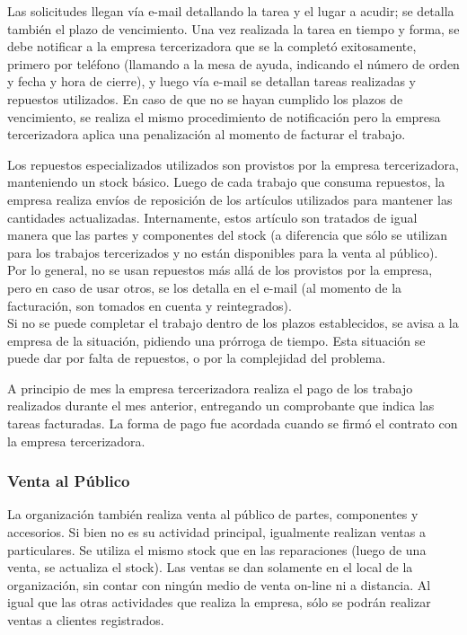 \documentclass[12pt]{extarticle}
\begin{document}
\begin{spacing}{1.2}
    Las solicitudes llegan vía e-mail detallando la tarea y el lugar a acudir; se detalla también el plazo de vencimiento.
    Una vez realizada la tarea en tiempo y forma, se debe notificar a la empresa tercerizadora que se la completó exitosamente, primero por teléfono (llamando a la mesa de ayuda, indicando el número de orden y fecha y hora de cierre), y luego vía e-mail se detallan tareas realizadas y repuestos utilizados.
    En caso de que no se hayan cumplido los plazos de vencimiento, se realiza el mismo procedimiento de notificación pero la empresa tercerizadora aplica una penalización al momento de facturar el trabajo.

    Los repuestos especializados utilizados son provistos por la empresa tercerizadora, manteniendo un stock básico. Luego de cada trabajo que consuma repuestos, la empresa realiza envíos de reposición de los artículos utilizados para mantener las cantidades actualizadas. 
    Internamente, estos artículo son tratados de igual manera que las partes y componentes del stock (a diferencia que sólo se utilizan para los trabajos tercerizados y no están disponibles para la venta al público).
    Por lo general, no se usan repuestos más allá de los provistos por la empresa, pero en caso de usar otros, se los detalla en el e-mail (al momento de la facturación, son tomados en cuenta y reintegrados).\\

    Si no se puede completar el trabajo dentro de los plazos establecidos, se avisa a la empresa de la situación, pidiendo una prórroga de tiempo. Esta situación se puede dar por falta de repuestos, o por la complejidad del problema.

    A principio de mes la empresa tercerizadora realiza el pago de los trabajo realizados durante el mes anterior, entregando un comprobante que indica las tareas facturadas. La forma de pago fue acordada cuando se firmó el contrato con la empresa tercerizadora.


    \subsubsection{Venta al Público}
    La organización también realiza venta al público de partes, componentes y accesorios. Si bien no es su actividad principal, igualmente realizan ventas a particulares. Se utiliza el mismo stock que en las reparaciones (luego de una venta, se actualiza el stock). 
    Las ventas se dan solamente en el local de la organización, sin contar con ningún medio de venta on-line ni a distancia. Al igual que las otras actividades que realiza la empresa, sólo se podrán realizar ventas a clientes registrados.


\end{spacing}
\end{document}
